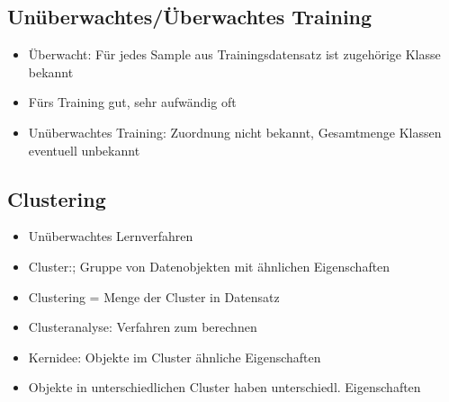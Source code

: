 \documentclass[a4paper,10pt,oneside]{article}
\begin{document}
\subsection{Unüberwachtes/Überwachtes Training}
\begin{itemize}
	\item Überwacht: Für jedes Sample aus Trainingsdatensatz ist zugehörige Klasse bekannt
	\item Fürs Training gut, sehr aufwändig oft
	\item Unüberwachtes Training: Zuordnung nicht bekannt, Gesamtmenge Klassen eventuell unbekannt
\end{itemize}


\subsection{Clustering}
\begin{itemize}
	\item Unüberwachtes Lernverfahren
	\item Cluster:; Gruppe von Datenobjekten mit ähnlichen Eigenschaften
	\item Clustering = Menge der Cluster in Datensatz
	\item Clusteranalyse: Verfahren zum berechnen
	\item Kernidee: Objekte im Cluster ähnliche Eigenschaften
	\item Objekte in unterschiedlichen Cluster haben unterschiedl. Eigenschaften
\end{itemize}
\end{document}

